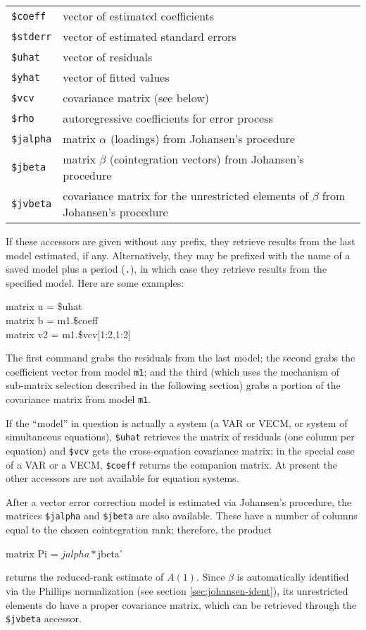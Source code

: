 \begin{center}
\begin{tabular}{ll}
\texttt{\$coeff} & vector of estimated coefficients \\
\texttt{\$stderr} & vector of estimated standard errors \\
\texttt{\$uhat} & vector of residuals \\
\texttt{\$yhat} & vector of fitted values \\
\texttt{\$vcv} & covariance matrix (see below) \\
\texttt{\$rho} & autoregressive coefficients for error process \\
\texttt{\$jalpha} & matrix $\alpha$ (loadings) from Johansen's procedure \\
\texttt{\$jbeta} & matrix $\beta$ (cointegration vectors) from
Johansen's procedure \\
\texttt{\$jvbeta} & covariance matrix for the unrestricted elements of
$\beta$ from Johansen's procedure
\end{tabular}
\end{center}

If these accessors are given without any prefix, they retrieve results
from the last model estimated, if any.  Alternatively, they may be
prefixed with the name of a saved model plus a period (\texttt{.}), in
which case they retrieve results from the specified model.  Here are
some examples:
%
\begin{textcode}
matrix u = \$uhat\\
matrix b = m1.\$coeff\\
matrix v2 = m1.\$vcv[1:2,1:2]
\end{textcode}
%
The first command grabs the residuals from the last model; the second
grabs the coefficient vector from model \texttt{m1}; and the third
(which uses the mechanism of sub-matrix selection described in the
following section) grabs a portion of the covariance matrix from model
\texttt{m1}.

If the ``model'' in question is actually a system (a VAR or VECM, or
system of simultaneous equations), \texttt{\$uhat} retrieves the
matrix of residuals (one column per equation) and \texttt{\$vcv} gets
the cross-equation covariance matrix; in the special case of a VAR or
a VECM, \texttt{\$coeff} returns the companion matrix. At present the
other accessors are not available for equation systems.

After a vector error correction model is estimated via Johansen's
procedure, the matrices \texttt{\$jalpha} and \texttt{\$jbeta} are
also available. These have a number of columns equal to the chosen
cointegration rank; therefore, the product
\begin{code}
matrix Pi = $jalpha * $jbeta'
\end{code}
returns the reduced-rank estimate of $A(1)$. Since $\beta$ is
automatically identified via the Phillips normalization (see section
\ref{sec:johansen-ident}), its unrestricted elements do have a proper
covariance matrix, which can be retrieved through the
\texttt{\$jvbeta} accessor.

